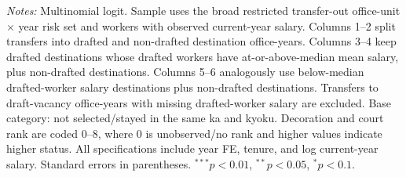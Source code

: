 \begin{table}[htbp]
\begin{threeparttable}
{\begin{tabular}{lcccccc}
\bottomrule
\end{tabular}}
\begin{tablenotes}[flushleft]\footnotesize
\item \textit{Notes:} Multinomial logit. Sample uses the broad restricted transfer-out office-unit $\times$ year risk set and workers with observed current-year salary. Columns 1--2 split transfers into drafted and non-drafted destination office-years. Columns 3--4 keep drafted destinations whose drafted workers have at-or-above-median mean salary, plus non-drafted destinations. Columns 5--6 analogously use below-median drafted-worker salary destinations plus non-drafted destinations. Transfers to draft-vacancy office-years with missing drafted-worker salary are excluded. Base category: not selected/stayed in the same ka and kyoku. Decoration and court rank are coded 0--8, where 0 is unobserved/no rank and higher values indicate higher status. All specifications include year FE, tenure, and log current-year salary. Standard errors in parentheses. $^{***}p<0.01$, $^{**}p<0.05$, $^{*}p<0.1$.
\end{tablenotes}\end{threeparttable}\end{table}
